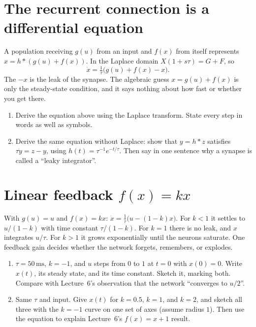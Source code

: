 \documentclass[11pt,letterpaper]{article}
\begin{document}
\section{The recurrent connection is a differential equation}

\begin{idea}
A population receiving $g(u)$ from an input and $f(x)$ from itself represents $x = h * (g(u) + f(x))$. In the Laplace domain $X(1 + s\tau) = G + F$, so
\[
\dot x = \tfrac{1}{\tau}\bigl(g(u) + f(x) - x\bigr).
\]
The $-x$ is the leak of the synapse. The algebraic guess $x = g(u) + f(x)$ is only the steady-state condition, and it says nothing about how fast or whether you get there.
\end{idea}

\begin{enumerate}
\item Derive the equation above using the Laplace transform. State every step in words as well as symbols.
\item Derive the same equation without Laplace: show that $y = h * z$ satisfies $\tau\dot y = z - y$, using $h(t) = \tau^{-1}e^{-t/\tau}$. Then say in one sentence why a synapse is called a ``leaky integrator''.
\end{enumerate}

\section{Linear feedback $f(x) = kx$}

\begin{idea}
With $g(u) = u$ and $f(x) = kx$: $\dot x = \frac{1}{\tau}\bigl(u - (1 - k)x\bigr)$. For $k < 1$ it settles to $u/(1 - k)$ with time constant $\tau/(1 - k)$. For $k = 1$ there is no leak, and $x$ integrates $u/\tau$. For $k > 1$ it grows exponentially until the neurons saturate. One feedback gain decides whether the network forgets, remembers, or explodes.
\end{idea}

\begin{enumerate}
\item $\tau = 50\,\mathrm{ms}$, $k = -1$, and $u$ steps from $0$ to $1$ at $t = 0$ with $x(0) = 0$. Write $x(t)$, its steady state, and its time constant. Sketch it, marking both. Compare with Lecture~6's observation that the network ``converges to $u/2$''.
\item Same $\tau$ and input. Give $x(t)$ for $k = 0.5$, $k = 1$, and $k = 2$, and sketch all three with the $k = -1$ curve on one set of axes (assume radius $1$). Then use the equation to explain Lecture~6's $f(x) = x + 1$ result.
\end{enumerate}
\end{document}
